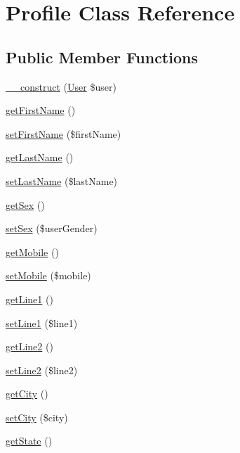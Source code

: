 \hypertarget{class_profile}{\section{Profile Class Reference}
\label{class_profile}
}
\subsection*{Public Member Functions}
\begin{DoxyCompactItemize}
\item 
\hyperlink{class_profile_a449e259f0fcc2537e4ba6bc399e6a139}{\+\_\+\+\_\+construct} (\hyperlink{class_user}{User} \$user)
\item 
\hyperlink{class_profile_ace5f32fc99c7c5989f7576755fc60972}{get\+First\+Name} ()
\item 
\hyperlink{class_profile_a83e84c312d983f847f8e48d6e457d081}{set\+First\+Name} (\$first\+Name)
\item 
\hyperlink{class_profile_a717286a8348a6cf9f6d5fecb04a55fad}{get\+Last\+Name} ()
\item 
\hyperlink{class_profile_a90ee65f53f523c6ec0abb74c014c3e2a}{set\+Last\+Name} (\$last\+Name)
\item 
\hyperlink{class_profile_aef150744e8ecbd0744b4780727fe77bb}{get\+Sex} ()
\item 
\hyperlink{class_profile_aaa45bf435ea91fa8f5a52e63a69e11fd}{set\+Sex} (\$user\+Gender)
\item 
\hyperlink{class_profile_ad6cda0470722fc55f19e6352e771bbd8}{get\+Mobile} ()
\item 
\hyperlink{class_profile_a73d18139c1f54fbb0d00e1c633b0ff0f}{set\+Mobile} (\$mobile)
\item 
\hyperlink{class_profile_a6e252e7cda0f0824185643364c3d01db}{get\+Line1} ()
\item 
\hyperlink{class_profile_ae34b6cbb779cf4a0b673c39fe1afe26a}{set\+Line1} (\$line1)
\item 
\hyperlink{class_profile_a64a1835482b922c414945f0e856adc6f}{get\+Line2} ()
\item 
\hyperlink{class_profile_a374d1f0db10e08bdf556faf4db3208bf}{set\+Line2} (\$line2)
\item 
\hyperlink{class_profile_ae9ca906fce6e9fe5fab3a6b42209d6a1}{get\+City} ()
\item 
\hyperlink{class_profile_a39e9794d2f98543fd616cb5b8f07c14a}{set\+City} (\$city)
\item 
\hyperlink{class_profile_afbf787ced76807989fb3093e1772c5a1}{get\+State} ()

\end{DoxyCompactItemize}

